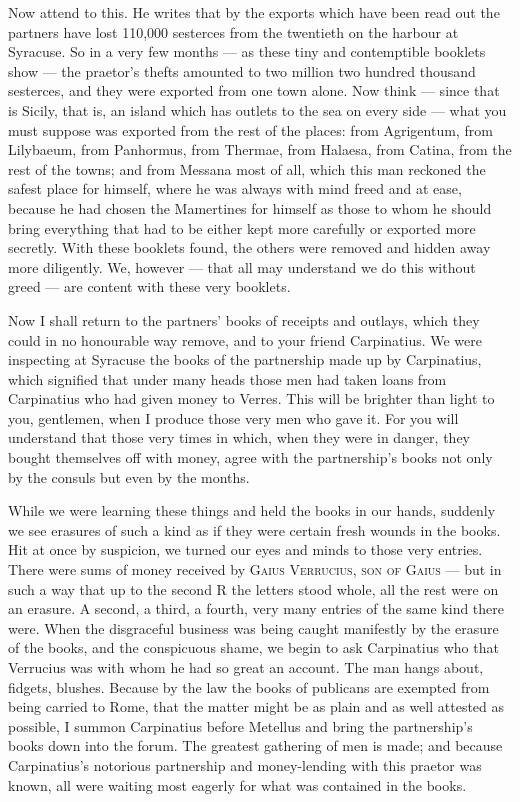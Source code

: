  Now attend to this. He writes that by the exports which have been read out the partners have lost 110,000 sesterces from the twentieth on the harbour at Syracuse. So in a very few months --- as these tiny and contemptible booklets show --- the praetor's thefts amounted to two million two hundred thousand sesterces, and they were exported from one town alone. Now think --- since that is Sicily, that is, an island which has outlets to the sea on every side --- what you must suppose was exported from the rest of the places: from Agrigentum, from Lilybaeum, from Panhormus, from Thermae, from Halaesa, from Catina, from the rest of the towns; and from Messana most of all, which this man reckoned the safest place for himself, where he was always with mind freed and at ease, because he had chosen the Mamertines for himself as those to whom he should bring everything that had to be either kept more carefully or exported more secretly. With these booklets found, the others were removed and hidden away more diligently. We, however --- that all may understand we do this without greed --- are content with these very booklets.

 Now I shall return to the partners' books of receipts and outlays, which they could in no honourable way remove, and to your friend Carpinatius. We were inspecting at Syracuse the books of the partnership made up by Carpinatius, which signified that under many heads those men had taken loans from Carpinatius who had given money to Verres. This will be brighter than light to you, gentlemen, when I produce those very men who gave it. For you will understand that those very times in which, when they were in danger, they bought themselves off with money, agree with the partnership's books not only by the consuls but even by the months.

 While we were learning these things and held the books in our hands, suddenly we see erasures of such a kind as if they were certain fresh wounds in the books. Hit at once by suspicion, we turned our eyes and minds to those very entries. There were sums of money received by \textsc{Gaius Verrucius, son of Gaius} --- but in such a way that up to the second R the letters stood whole, all the rest were on an erasure. A second, a third, a fourth, very many entries of the same kind there were. When the disgraceful business was being caught manifestly by the erasure of the books, and the conspicuous shame, we begin to ask Carpinatius who that Verrucius was with whom he had so great an account. The man hangs about, fidgets, blushes. Because by the law the books of publicans are exempted from being carried to Rome, that the matter might be as plain and as well attested as possible, I summon Carpinatius before Metellus and bring the partnership's books down into the forum. The greatest gathering of men is made; and because Carpinatius's notorious partnership and money-lending with this praetor was known, all were waiting most eagerly for what was contained in the books.

